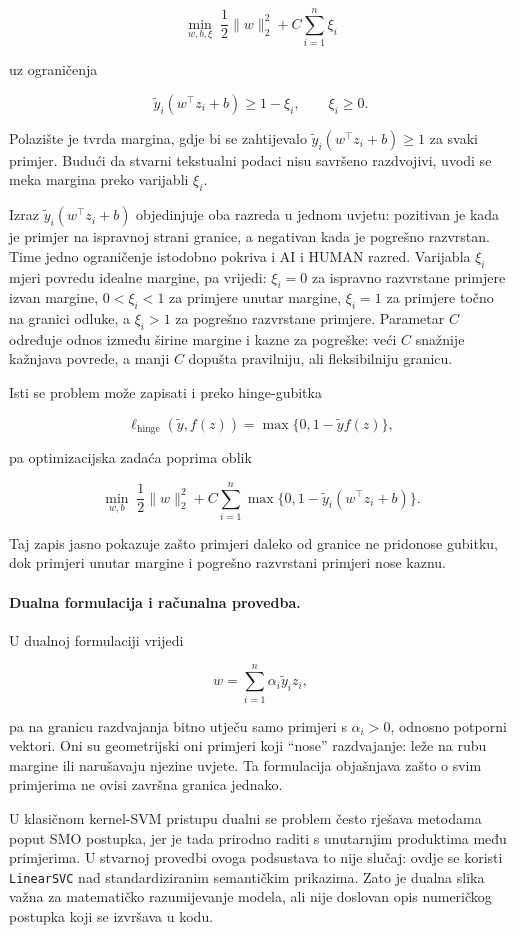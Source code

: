 \[
\min_{w,b,\xi}\;\frac{1}{2}\|w\|_2^2 + C\sum_{i=1}^n \xi_i
\]

uz ograničenja

\[
\tilde y_i(w^\top z_i+b)\ge 1-\xi_i,
\qquad
\xi_i\ge 0.
\]

Polazište je tvrda margina, gdje bi se zahtijevalo $\tilde y_i(w^\top z_i+b)\ge 1$ za svaki primjer. Budući da stvarni tekstualni podaci nisu savršeno razdvojivi, uvodi se meka margina preko varijabli $\xi_i$.

Izraz $\tilde y_i(w^\top z_i+b)$ objedinjuje oba razreda u jednom uvjetu: pozitivan je kada je primjer na ispravnoj strani granice, a negativan kada je pogrešno razvrstan. Time jedno ograničenje istodobno pokriva i AI i HUMAN razred. Varijabla $\xi_i$ mjeri povredu idealne margine, pa vrijedi: $\xi_i=0$ za ispravno razvrstane primjere izvan margine, $0<\xi_i<1$ za primjere unutar margine, $\xi_i=1$ za primjere točno na granici odluke, a $\xi_i>1$ za pogrešno razvrstane primjere. Parametar $C$ određuje odnos između širine margine i kazne za pogreške: veći $C$ snažnije kažnjava povrede, a manji $C$ dopušta pravilniju, ali fleksibilniju granicu.

Isti se problem može zapisati i preko hinge-gubitka

\[
\ell_{\mathrm{hinge}}(\tilde y,f(z)) = \max\{0,1-\tilde y f(z)\},
\]

pa optimizacijska zadaća poprima oblik

\[
\min_{w,b}\;\frac{1}{2}\|w\|_2^2 + C\sum_{i=1}^n \max\{0,1-\tilde y_i(w^\top z_i+b)\}.
\]

Taj zapis jasno pokazuje zašto primjeri daleko od granice ne pridonose gubitku, dok primjeri unutar margine i pogrešno razvrstani primjeri nose kaznu.

\paragraph{Dualna formulacija i računalna provedba.}
U dualnoj formulaciji vrijedi

\[
w=\sum_{i=1}^n \alpha_i \tilde y_i z_i,
\]

pa na granicu razdvajanja bitno utječu samo primjeri s $\alpha_i>0$, odnosno potporni vektori. Oni su geometrijski oni primjeri koji ``nose'' razdvajanje: leže na rubu margine ili narušavaju njezine uvjete. Ta formulacija objašnjava zašto o svim primjerima ne ovisi završna granica jednako.

U klasičnom kernel-SVM pristupu dualni se problem često rješava metodama poput SMO postupka, jer je tada prirodno raditi s unutarnjim produktima među primjerima. U stvarnoj provedbi ovoga podsustava to nije slučaj: ovdje se koristi \texttt{LinearSVC} nad standardiziranim semantičkim prikazima. Zato je dualna slika važna za matematičko razumijevanje modela, ali nije doslovan opis numeričkog postupka koji se izvršava u kodu.

